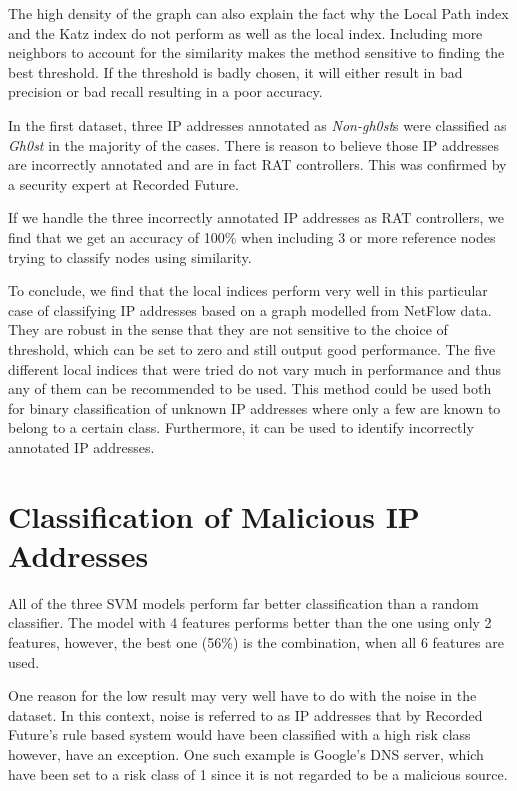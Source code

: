 The high density of the graph can also explain the fact why the Local Path index and the Katz index do not perform as well as the local index. Including more neighbors to account for the similarity makes the method sensitive to finding the best threshold. If the threshold is badly chosen, it will either result in bad precision or bad recall resulting in a poor accuracy.

In the first dataset, three IP addresses annotated as \textit{Non-gh0st}s were classified as \textit{Gh0st} in the majority of the cases. There is reason to believe those IP addresses are incorrectly annotated and are in fact RAT controllers. This was confirmed by a security expert at Recorded Future.

If we handle the three incorrectly annotated IP addresses as RAT controllers, we find that we get an accuracy of 100\% when including 3 or more reference nodes trying to classify nodes using similarity. 

To conclude, we find that the local indices perform very well in this particular case of classifying IP addresses based on a graph modelled from NetFlow data. They are robust in the sense that they are not sensitive to the choice of threshold, which can be set to zero and still output good performance. The five different local indices that were tried do not vary much in performance and thus any of them can be recommended to be used. This method could be used both for binary classification of unknown IP addresses where only a few are known to belong to a certain class. Furthermore, it can be used to identify incorrectly annotated IP addresses. 

\section{Classification of Malicious IP Addresses}
All of the three SVM models perform far better classification than a random classifier. The model with 4 features performs better than the one using only 2 features, however, the best one (56\%) is the combination, when all 6 features are used. 

One reason for the low result may very well have to do with the noise in the dataset. In this context, noise is referred to as IP addresses that by Recorded Future's rule based system would have been classified with a high risk class however, have an exception. One such example is Google's DNS server, which have been set to a risk class of 1 since it is not regarded to be a malicious source. 

